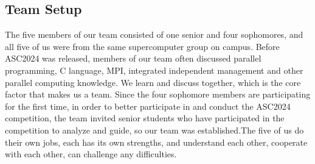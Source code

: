 \documentclass[a4paper,12pt]{article}
\begin{document}
\subsection{Team Setup}
The five members of our team consisted of one senior and four sophomores, and all five of us were from the same supercomputer group on campus. Before ASC2024 was released, members of our team often discussed parallel programming, C language, MPI, integrated independent management and other parallel computing knowledge. We learn and discuss together, which is the core factor that makes us a team. Since the four sophomore members are participating for the first time, in order to better participate in and conduct the ASC2024 competition, the team invited senior students who have participated in the competition to analyze and guide, so our team was established.The five of us do their own jobs, each has its own strengths, and understand each other, cooperate with each other, can challenge any difficulties.
\end{document}

